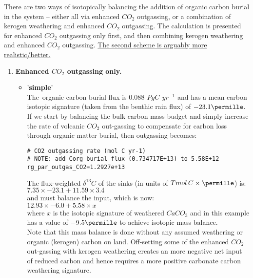 \vspace{1mm}

There are two ways of isotopically balancing the addition of organic carbon burial in the system -- either all via enhanced \(CO_{2}\) outgassing, or a combination of kerogen weathering and enhanced \(CO_{2}\) outgassing. The calculation is presented for enhanced \(CO_{2}\) outgassing only first, and then combining kerogen weathering and enhanced \(CO_{2}\) outgassing. \uline{The second scheme is arguably more realistic/better.}

\newpage
%
\begin{enumerate}[noitemsep]

\vspace{2mm}
\item \textbf{Enhanced \(CO_{2}\) outgassing only.}

\begin{itemize}[noitemsep]

\vspace{1mm}
\item '\textbf{simple}'
\vspace{1mm}
\\The\ organic carbon burial flux is \(0.088\,\ PgC\,\ yr^{-1}\) and has a mean carbon isotopic signature (taken from the benthic rain flux) of \(-23.1\permille\).
\vspace{1mm}
\\If we start by balancing the bulk carbon mass budget and simply increase the rate of volcanic \(CO_{2}\) out-gassing to compensate for carbon loss through organic matter burial, then outgassing becomes:
\vspace{-1mm}\small\begin{verbatim}
# CO2 outgassing rate (mol C yr-1) 
# NOTE: add Corg burial flux (0.734717E+13) to 5.58E+12
rg_par_outgas_CO2=1.2927e+13
\end{verbatim}\normalsize\vspace{-1mm}
The flux-weighted \(\delta^{13}C\) of the sinks (in units of \(Tmol\,C \times \permille\)) is:
\\\(7.35\times -23.1 + 11.59\times 3.4\)
\\and must balance the input, which is now:  
\\\(12.93\times -6.0 + 5.58\times x\)
\\where \(x\) is the isotopic signature of weathered \(CaCO_{3}\) and in this example has a value of \(-9.5\permille\) to achieve isotopic mass balance.
\vspace{1mm}
\\Note that this mass balance is done without any assumed weathering or organic (kerogen) carbon on land. Off-setting some of the enhanced \(CO_{2}\) out-gassing with kerogen weathering creates an more negative net input of reduced carbon and hence requires a more positive carbonate carbon weathering signature.


\end{itemize}
\end{enumerate}

